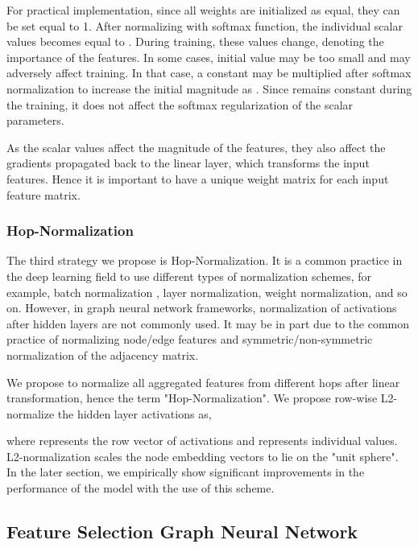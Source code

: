 \documentclass[sigconf,natbib=false]{acmart}
\begin{document}
 For practical implementation, since all weights are initialized as equal, they can be set equal to 1. After normalizing with softmax function, the individual scalar values becomes equal to . During training, these values change, denoting the importance of the features. In some cases, initial  value may be too small and may adversely affect training. In that case, a constant  may be multiplied after softmax normalization to increase the initial magnitude as . Since  remains constant during the training, it does not affect the softmax regularization of the scalar parameters. 
 
 As the scalar values affect the magnitude of the features, they also affect the gradients propagated back to the linear layer, which transforms the input features. Hence it is important to have a unique weight matrix for each input feature matrix.

\subsubsection{Hop-Normalization}\hfill

The third strategy we propose is Hop-Normalization. It is a common practice in the deep learning field to use different types of normalization schemes, for example, batch normalization \cite{ioffe_batch_2015}, layer normalization, weight normalization, and so on. However, in graph neural network frameworks, normalization of activations after hidden layers are not commonly used. It may be in part due to the common practice of normalizing node/edge features and symmetric/non-symmetric normalization of the adjacency matrix.

We propose to normalize all aggregated features from different hops after linear transformation, hence the term "Hop-Normalization". We propose row-wise L2-normalize the hidden layer activations as,



 where  represents the  row vector of activations and  represents individual values. L2-normalization scales the node embedding vectors to lie on the "unit sphere". In the later section, we empirically show significant improvements in the performance of the model with the use of this scheme.




\subsection{Feature Selection Graph Neural Network}
\end{document}
